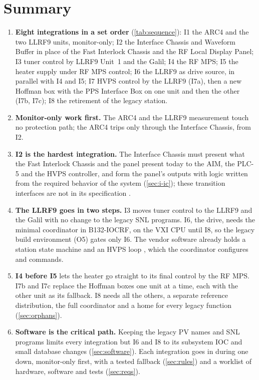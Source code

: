 \section{Summary}\label{sec:summary}

\begin{enumerate}
\item \textbf{Eight integrations in a set order} (\cref{tab:sequence}): I1 the ARC4
and the two LLRF9 units, monitor-only; I2 the Interface Chassis and Waveform Buffer in
place of the Fast Interlock Chassis and the RF Local Display Panel; I3 tuner control by
LLRF9 Unit~1 and the Galil; I4 the RF MPS; I5 the heater supply under RF MPS control;
I6 the LLRF9 as drive source, in parallel with I4 and I5; I7 HVPS control by the LLRF9
(I7a), then a new Hoffman box with the PPS Interface Box on one unit and then the
other (I7b, I7c); I8 the retirement of the legacy station.
\item \textbf{Monitor-only work first.} The ARC4 and the LLRF9 measurement touch no
protection path; the ARC4 trips only through the Interface Chassis, from I2.
\item \textbf{I2 is the hardest integration.} The Interface Chassis must present what
the Fast Interlock Chassis and the panel present today to the AIM, the PLC-5 and the
HVPS controller, and form the panel's outputs with logic written from the required
behavior of the system (\cref{sec:i-ic}); these transition interfaces are not in its
specification .
\item \textbf{The LLRF9 goes in two steps.} I3 moves tuner control to the LLRF9 and
the Galil with no change to the legacy SNL programs. I6, the drive, needs the minimal
coordinator in \mbox{B132-IOCRF}, on the VXI CPU until I8, so the legacy build
environment (O5) gates only I6. The vendor software already holds a station state
machine and an HVPS loop , which the coordinator configures and commands.
\item \textbf{I4 before I5} lets the heater go straight to its final control by the
RF MPS. I7b and I7c replace the Hoffman boxes one unit at a time, each with the other
unit as its fallback. I8 needs all the others, a separate reference distribution, the
full coordinator and a home for every legacy function (\cref{sec:orphans}).
\item \textbf{Software is the critical path.} Keeping the legacy PV names and SNL
programs limits every integration but I6 and I8 to its subsystem IOC and small
database changes (\cref{sec:software}). Each integration goes in during one down,
monitor-only first, with a tested fallback (\cref{sec:rules}) and a worklist of
hardware, software and tests (\cref{sec:reqs}).
\end{enumerate}

